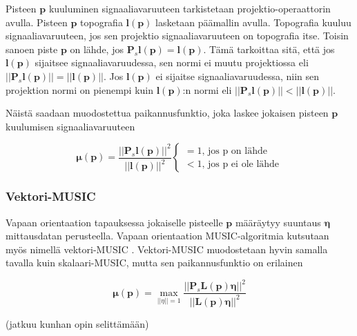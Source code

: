 Pisteen $\mathbf{p}$ kuuluminen signaaliavaruuteen tarkistetaan projektio-operaattorin avulla. Pisteen $\mathbf{p}$ topografia $\mathbf{l(p)}$ lasketaan päämallin avulla. Topografia kuuluu signaaliavaruuteen, jos sen projektio signaaliavaruuteen on topografia itse. Toisin sanoen piste $\mathbf{p}$ on lähde, jos $\mathbf{P}_s\mathbf{l(p)} = \mathbf{l(p)}$. Tämä tarkoittaa sitä, että jos $\mathbf{l(p)}$ sijaitsee signaaliavaruudessa, sen normi ei muutu projektiossa eli $||\mathbf{P}_s\mathbf{l(p)}||=||\mathbf{l(p)}||$. Jos $\mathbf{l(p)}$ ei sijaitse signaaliavaruudessa, niin sen projektion normi on pienempi kuin $\mathbf{l(p)}$:n normi eli
$||\mathbf{P}_s\mathbf{l(p)}||<||\mathbf{l(p)}||$. \citep{Makela2018TruncatedLocalization}

Näistä saadaan muodostettua paikannusfunktio, joka laskee jokaisen pisteen $\mathbf{p}$ kuulumisen signaaliavaruuteen

\begin{equation}
    \mathbf{\mu(p)} = \frac{||\mathbf{P}_s\mathbf{l(p)}||^2}{||\mathbf{l(p)}||^2} 
    \begin{cases}
    =1\text{, jos p on lähde}\\
    <1\text{, jos p ei ole lähde}
     \end{cases}
\end{equation}

\subsubsection{Vektori-MUSIC}
Vapaan orientaation tapauksessa jokaiselle pisteelle $\mathbf{p}$ määräytyy suuntaus $\mathbf{\eta}$ mittausdatan perusteella. Vapaan orientaation MUSIC-algoritmia kutsutaan myös nimellä vektori-MUSIC \citep{Makela2018TruncatedLocalization}. Vektori-MUSIC muodostetaan hyvin samalla tavalla kuin skalaari-MUSIC, mutta sen paikannusfunktio on erilainen

\begin{equation}
    \mathbf{\mu(p)} = \max_{||\eta||=1} \frac{||\mathbf{P}_s\mathbf{L(p)\eta}||^2}{||\mathbf{L(p)\eta}||^2}
\end{equation}

(jatkuu kunhan opin selittämään)